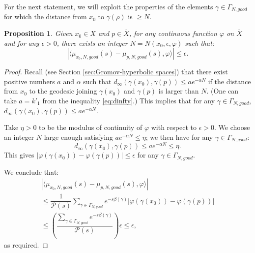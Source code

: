 \documentclass[12pt]{amsbook}%
\newtheorem{prop}[thm]{Proposition}
\theoremstyle{definition}
\theoremstyle{remark}
\numberwithin{section}{chapter}
\numberwithin{subsection}{section}
\numberwithin{figure}{chapter}
\newcommand\bac[1]{{\color{blue} #1} }
\def\cP{{\mathscr{P}}}
\def\Ga{\Gamma}
\def\ol{\overline}
\begin{document}
{{For the next statement, we will exploit the properties of the elements $\gamma \in  \Ga_{N,good}$ for which the distance from $x_0$ to $\gamma(\rho)$ is  $\geqslant N$. 



\begin{prop} \label{prop_good} Given $x_0 \in X$ and $p \in \ol{X}$, 
for any continuous function $\varphi$ on $\ol{X}$ and for any $\epsilon>0$, there exists an 
integer $N=N (x_0,\epsilon, \varphi) $ such that: 
\begin{equation*}
| \langle \mu_{x_0, N, good}(s) - \mu_{p,N,good}(s) , \varphi\rangle | \leqslant \epsilon. 
\end{equation*} 
\end{prop}

\begin{proof}
Recall (see Section \ref{sec:Gromov-hyperbolic spaces}) that there exist positive numbers $a$ and $\alpha$ such that $d_{\infty}(\gamma(x_0),\gamma(p)) \leqslant a e^{-\alpha N}$ if the distance from $x_0$ to the geodesic joining $\gamma(x_0)$ and $\gamma(p)$ is larger than $N$. (One can take $a=k'_1$ from the inequality  \eqref{eq:dinfty}.)  
This implies that for any $\gamma \in \Gamma_{N,good}$, $d_{\infty}(\gamma(x_0), \gamma(p)) \leqslant ae^{-\alpha N}$. 

Take $\eta>0$ to be the modulus of continuity of $\varphi$ with respect to $\epsilon>0$. We choose an integer $N$ large enough satisfying $ae^{-\alpha N} \leqslant \eta$;  we then have for any $\gamma \in \Gamma_{N,good}$: 
\begin{equation*}
d_{\infty}(\gamma(x_0), \gamma(p)) \leqslant ae^{-\alpha N} \leqslant \eta.
\end{equation*}
This gives $|\varphi(\gamma(x_0)) - \varphi( \gamma(p))| \leqslant \epsilon $ for any $\gamma \in \Gamma_{N,good}$. 



We conclude that: 
\begin{align*}
| \langle \mu_{x_0, N, good}(s) - \mu_{p,N,good}(s) , \varphi\rangle |  \\
 \leqslant \dfrac{1}{\cP(s)} \sum_{\gamma \in \Gamma_{N,good} } e^{-s\beta(\gamma)} |\varphi(\gamma(x_0)) - \varphi(\gamma(p))| \\
\leqslant \left  (\dfrac{\sum_{\gamma \in \Gamma_{N,good} } e^{-s\beta(\gamma)}}{\cP(s)} \right )  \epsilon \leqslant \epsilon,
\end{align*}
as required. 
\end{proof}




}}
\end{document}

